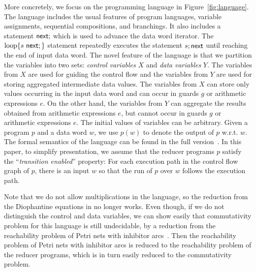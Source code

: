 More concretely, we focus on the programming language in Figure~\ref{fig:language}. The language includes the usual features of program languages, variable assignments, sequential compositions, and branchings. It also includes a statement $\mathsf{next};$ which is used to advance the data word iterator. The $\loopL{s\ \nnext;}$ statement repeatedly executes the statement $s;\mathsf{next}$ until reaching the end of input data word.
The novel feature of the language is that we partition the variables into two sets: \emph{control variables} $X$ and \emph{data variables} $Y$.
The variables from $X$ are used for guiding the control flow and the variables from $Y$ are used for storing aggregated intermediate data values.
The variables from $X$ can store only values occurring in the input data word and can occur in guards $g$ or arithmetic expressions $e$.
On the other hand, the variables from $Y$ can aggregate the results obtained from arithmetic expressions $e$, but cannot occur in guards $g$ or arithmetic expressions $e$. The initial values of variables can be arbitrary.
Given a program $p$ and a data word $w$, we use $p(w)$ to denote the output of $p$ w.r.t. $w$. The formal semantics of the language can be found in the full version~\cite{full-version}. In this paper, to simplify presentation, we assume that the reducer programs $p$ satisfy the ``\emph{transition enabled}'' property: For each execution path in the control flow graph of $p$, there is an input $w$ so that the run of $p$ over $w$ follows the execution path. %

Note that we do not allow multiplications in the language, so the reduction from the Diophantine equations in \cite{CHSW15} no longer works. Even though, if we do not distinguish the control and data variables, we can show easily that commutativity problem for this language is still undecidable, by a reduction from the reachability problem of Petri nets with inhibitor arcs~\cite{Min71,Rei08}.
Then the reachability problem of Petri nets with inhibitor arcs is reduced to the reachability problem of the reducer programs, which is in turn easily reduced to the commutativity problem.

